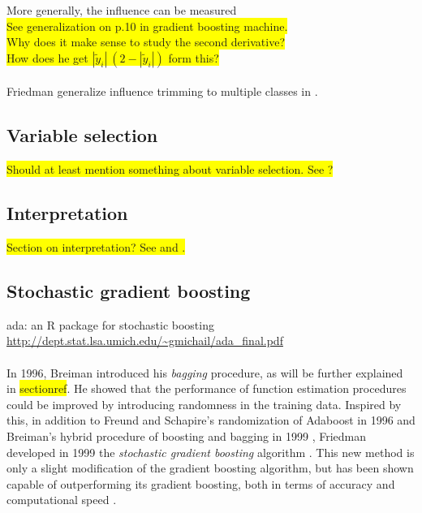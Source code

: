 More generally, the influence can be measured \\
\colorbox{yellow}{See generalization on p.10 in gradient boosting machine.}\\
\colorbox{yellow}{Why does it make sense to study the second derivative?}\\
\colorbox{yellow}{How does he get $|\tilde{y}_i|\: (2 - |\tilde{y}_i|)$ form this?}\\
\\
Friedman generalize influence trimming to multiple classes in \cite{friedman}.




\subsection{Variable selection}
\label{sub:Variable selection}
\colorbox{yellow}{Should at least mention something about variable selection. See \cite[sec. 8.1]{friedman}?}

\subsection{Interpretation}
\label{sub:Interpretation}
\colorbox{yellow}{Section on interpretation? See \cite[10.3]{modstat} and \cite{friedman}.}

\subsection{Stochastic gradient boosting}
\label{sub:Stochastic gradient boosting}
ada: an R package for stochastic boosting \url{http://dept.stat.lsa.umich.edu/~gmichail/ada_final.pdf} \\
\\
In 1996, Breiman \cite{Breiman1996} introduced his \textit{bagging} procedure, as will be further explained in  \colorbox{yellow}{sectionref}. He showed that the performance of function estimation procedures could be improved by introducing randomness in the training data. Inspired by this, in addition to Freund and Schapire's randomization of Adaboost in 1996 \cite{freund1996} and Breiman's hybrid procedure of boosting and bagging in 1999 \cite{breiman1999}, Friedman developed in 1999 the \textit{stochastic gradient boosting} algorithm \cite{FriedmanStochBoost}.
This new method is only a slight modification of the gradient boosting algorithm, but has been shown capable of outperforming its gradient boosting, both in terms of accuracy and computational speed  \cite{FriedmanStochBoost}.

